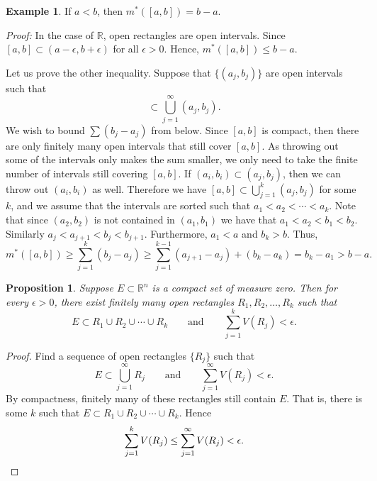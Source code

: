 \documentclass[12pt]{book}
\newcommand{\R}{{\mathbb{R}}}
\theoremstyle{plain}
\newtheorem{prop}[thm]{Proposition}
\theoremstyle{remark}
\theoremstyle{definition}
\theoremstyle{exercise}
\theoremstyle{example}
\newtheorem{example}[thm]{Example}
\begin{document}
\begin{example}
If $a < b$, then $m^*([a,b]) = b-a$.

\emph{Proof:}
In the case of $\R$, open rectangles are open intervals.
Since $[a,b] \subset (a-\epsilon,b+\epsilon)$ for all $\epsilon > 0$.
Hence, $m^*([a,b]) \leq b-a$.

Let us prove the other inequality.
Suppose that $\{ (a_j,b_j) \}$ are open intervals such that
\begin{equation*}
[a,b] \subset \bigcup_{j=1}^\infty (a_j,b_j) .
\end{equation*}
We wish to bound $\sum (b_j-a_j)$ from below.
Since $[a,b]$ is compact, then there are only finitely many open intervals
that still cover $[a,b]$.  As throwing out some of the intervals only makes the
sum smaller, we only need to take the finite number of intervals
still covering $[a,b]$.
If $(a_i,b_i) \subset (a_j,b_j)$, then we can throw out
$(a_i,b_i)$ as well.
Therefore we have
$[a,b] \subset \bigcup_{j=1}^k (a_j,b_j)$ for some $k$, and
we assume that the intervals are sorted such that $a_1 < a_2 < \cdots <
a_k$.  Note that since $(a_2,b_2)$ is not contained in $(a_1,b_1)$
we have that $a_1 < a_2 < b_1 < b_2$.  Similarly
$a_j < a_{j+1} < b_j < b_{j+1}$.  Furthermore, $a_1 < a$ and $b_k > b$.
Thus,
\begin{equation*}
m^*([a,b]) \geq
\sum_{j=1}^k (b_j-a_j)
\geq
\sum_{j=1}^{k-1} (a_{j+1}-a_j)
+
(b_k-a_k)
=
b_k-a_1 > b-a .
\end{equation*}
\end{example}

\begin{prop} \label{mv:prop:compactnull}
Suppose $E \subset \R^n$ is a compact set of measure zero.  Then for
every $\epsilon > 0$, there exist
finitely many open rectangles $R_1,R_2,\ldots,R_k$ such that
\begin{equation*}
E \subset R_1 \cup R_2 \cup \cdots \cup R_k
\qquad \text{and} \qquad
\sum_{j=1}^k V(R_j) < \epsilon.
\end{equation*}
\end{prop}

\begin{proof}
Find a sequence of open rectangles $\{ R_j \}$ such that 
\begin{equation*}
E \subset \bigcup_{j=1}^\infty R_j
\qquad \text{and} \qquad
\sum_{j=1}^\infty V(R_j) < \epsilon.
\end{equation*}
By compactness, finitely
many of these rectangles still contain $E$.  That is, there is some $k$ such
that
$E \subset R_1 \cup R_2 \cup \cdots \cup R_k$.  Hence
\begin{equation*}
\sum_{j=1}^k V(R_j) \leq
\sum_{j=1}^\infty V(R_j) < \epsilon. \qedhere
\end{equation*}
\end{proof}
\end{document}
